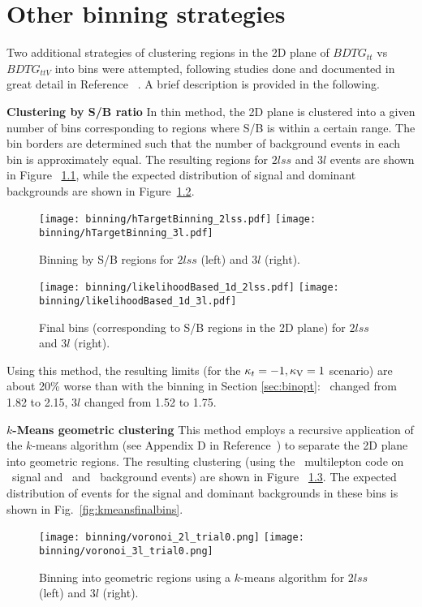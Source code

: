 \chapter{Other binning strategies}\label{app:ad_binning}

Two additional strategies of clustering regions in the 2D plane of $BDTG_{tt}$ vs $BDTG_{ttV}$ into bins were attempted, following studies done and documented in great detail in Reference ~\cite{CMS_AN_2017-029}. A brief description is provided in the following.

\textbf{Clustering by S/B ratio}
In thin method, the 2D plane is clustered into a given number of bins corresponding to regions where S/B is within a certain range. The bin borders are determined such that the number of background events in each bin is approximately equal. The resulting regions for $2lss$ and $3l$  events are shown in Figure ~\ref{fig:sbbinning}, while the expected distribution of signal and dominant backgrounds are shown in Figure~\ref{fig:sbfinalbins}.

\begin{figure} [!h]
  \centering
  \texttt{[image: binning/hTargetBinning\_2lss.pdf]}
  \texttt{[image: binning/hTargetBinning\_3l.pdf]}
  \caption{Binning by S/B regions for $2lss$ (left) and $3l$ (right).}
  \label{fig:sbbinning}
\end{figure}

\begin{figure} [!h]
  \centering
  \texttt{[image: binning/likelihoodBased\_1d\_2lss.pdf]}
  \texttt{[image: binning/likelihoodBased\_1d\_3l.pdf]}
  \caption[Final bins (corresponding to S/B regions in the 2D plane)]{Final bins (corresponding to S/B regions in the 2D plane) for $2lss$ and $3l$ (right).}
  \label{fig:sbfinalbins}
\end{figure}

Using this method, the resulting limits (for the $\kappa_t=-1, \kappa_\text{V}=1$ scenario) are about 20\% worse than with the binning in Section \ref{sec:binopt}: \mumu\ changed from 1.82 to 2.15, $3l$ changed from 1.52 to 1.75.

\textbf{$k$-Means geometric clustering}
This method employs a recursive application of the $k$-means algorithm (see Appendix D in Reference~\cite{CMS_AN_2017-029}) to separate the 2D plane into geometric regions. The resulting clustering (using the \ttH\ multilepton code on \tHq\ signal and \ttbar\ and \ttV\ background events) are shown in Figure ~\ref{fig:kmeansbinning}. The expected distribution of events for the signal and dominant backgrounds in these bins is shown in Fig.~\ref{fig:kmeansfinalbins}.
\begin{figure} [!h]
  \centering
  \texttt{[image: binning/voronoi\_2l\_trial0.png]}
  \texttt{[image: binning/voronoi\_3l\_trial0.png]}
  \caption[Binning into geometric regions using a $k$-means algorithm.]{Binning into geometric regions using a $k$-means algorithm for $2lss$ (left) and $3l$ (right).}
  \label{fig:kmeansbinning}
\end{figure}

